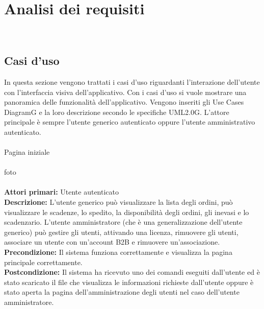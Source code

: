 
\chapter{Analisi dei requisiti}
\label{cap:analisi-requisiti}

\\


\section{Casi d'uso}

In questa sezione vengono trattati i casi d'uso riguardanti l'interazione dell'utente con l'interfaccia visiva dell'applicativo. Con i casi d'uso si vuole mostrare una panoramica delle funzionalità dell'applicativo. Vengono inseriti gli Use Cases DiagramG e la loro descrizione secondo le specifiche UML2.0G. L’attore principale è sempre l'utente generico autenticato oppure l'utente  amministrativo autenticato. \\\\

 Pagina iniziale \\\\

foto\\\\

\textbf{Attori primari:}   Utente autenticato\\


\textbf{Descrizione:} L’utente generico può visualizzare la lista degli ordini, può visualizzare le scadenze, lo spedito, la disponibilità degli ordini, gli inevasi e lo scadenzario. L’utente amministratore (che è una generalizzazione dell’utente generico) può gestire gli utenti, attivando una licenza, rimuovere gli utenti, associare un utente con un’account B2B e rimuovere un’associazione. \\

\textbf{Precondizione:}  Il sistema funziona correttamente e visualizza la pagina principale correttamente. \\

\textbf{Postcondizione:} Il sistema ha ricevuto uno dei comandi eseguiti dall’utente ed è stato scaricato il file che visualizza le informazioni richieste dall’utente oppure è stato aperta la pagina dell’amministrazione degli utenti nel caso dell’utente amministratore.\\


